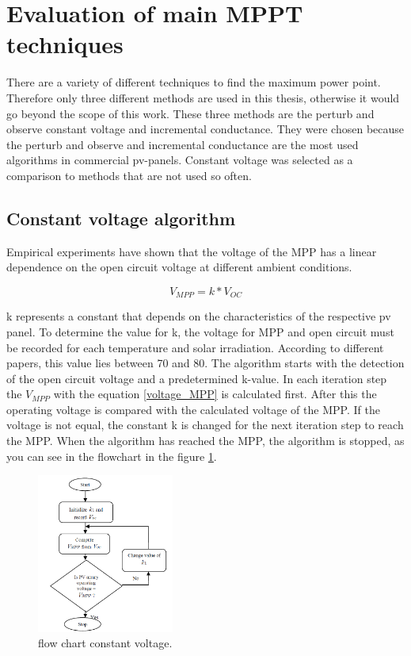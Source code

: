 \section{Evaluation of main MPPT techniques\label{MPPTalgo}}

There are a variety of different techniques to find the maximum power point. Therefore only three different methods are used in this thesis, otherwise it would go beyond the scope of this work. These three methods are the perturb and observe constant voltage and incremental conductance. They were chosen because the perturb and observe and incremental conductance are the most used algorithms in commercial pv-panels. Constant voltage was selected as a comparison to methods that are not used so often. 

\subsection{Constant voltage algorithm}
Empirical experiments have shown that the voltage of the MPP has a linear dependence on the open circuit voltage at different ambient conditions.

\begin{equation} \label{voltage_MPP}
V_{MPP} = k * V_{OC}	
\end{equation} 

k represents a constant that depends on the characteristics of the respective pv panel. To determine the value for k, the voltage for MPP and open circuit must be recorded for each temperature and solar irradiation. According to different papers, this value lies between 70 and 80. The algorithm starts with the detection of the open circuit voltage and a predetermined k-value. In each iteration step the $V_{MPP}$ with the equation \ref{voltage_MPP} is calculated first. After this the operating voltage is compared with the calculated voltage of the MPP. If the voltage is not equal, the constant k is changed for the next iteration step to reach the MPP. When the algorithm has reached the MPP, the algorithm is stopped, as you can see in the flowchart in the figure \ref{fcconstantvoltage}.

\begin{figure}[htbp]
	\begin{center}
		\includegraphics[width=0.4\textwidth]{../Pictures/P1/Flow_chart/Flow_chart_constant_voltage}
		\caption{flow chart constant voltage. }
		\label{fcconstantvoltage}
	\end{center}	
\end{figure}

